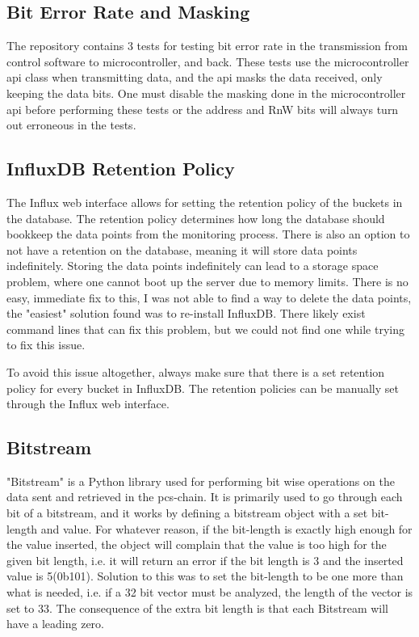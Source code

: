 \documentclass[main.tex]{subfiles}
\begin{document}
\subsection{Bit Error Rate and Masking}

The repository contains 3 tests for testing bit error rate in the transmission from control software to microcontroller, and back. These tests use the microcontroller \gls{api} class when transmitting data, and the \gls{api} masks the data received, only keeping the data bits. One must disable the masking done in the microcontroller \gls{api} before performing these tests or the address and RnW bits will always turn out erroneous in the tests.


\subsection{InfluxDB Retention Policy}

The Influx web interface allows for setting the retention policy of the buckets in the database. The retention policy determines how long the database should bookkeep the data points from the monitoring process. There is also an option to not have a retention on the database, meaning it will store data points indefinitely. Storing the data points indefinitely can lead to a storage space problem, where one cannot boot up the server due to memory limits. There is no easy, immediate fix to this, I was not able to find a way to delete the data points, the "easiest" solution found was to re-install InfluxDB. There likely exist command lines that can fix this problem, but we could not find one while trying to fix this issue.

To avoid this issue altogether, always make sure that there is a set retention policy for every bucket in InfluxDB. The retention policies can be manually set through the Influx web interface.

\subsection{Bitstream}

"Bitstream" is a Python library used for performing bit wise operations on the data sent and retrieved in the \gls{pcs}-chain. It is primarily used to go through each bit of a bitstream, and it works by defining a bitstream object with a set bit-length and value. For whatever reason, if the bit-length is exactly high enough for the value inserted, the object will complain that the value is too high for the given bit length, i.e. it will return an error if the bit length is 3 and the inserted value is 5(0b101). Solution to this was to set the bit-length to be one more than what is needed, i.e. if a 32 bit vector must be analyzed, the length of the vector is set to 33. The consequence of the extra bit length is that each Bitstream will have a leading zero.
\end{document}
